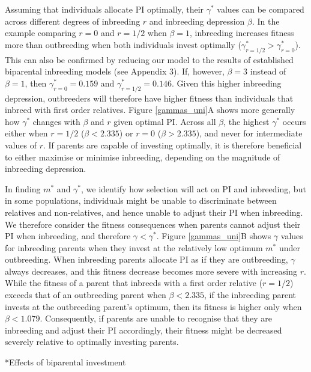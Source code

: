 \documentclass[12pt]{article}
\makeatletter
\renewcommand\subsection{\@startsection{subsection}{1}{-0.25in}{-0.5\baselineskip}{0.1\baselineskip}{\normalfont\normalsize\bfseries\textit}}
\makeatother
\begin{document}
Assuming that individuals allocate PI optimally, their $\gamma^{*}$ values can be compared across different degrees of inbreeding $r$ and inbreeding depression $\beta$. In the example comparing $r=0$ and $r=1/2$ when $\beta=1$, inbreeding increases fitness more than outbreeding when both individuals invest optimally ($\gamma^{*}_{r=1/2}>\gamma^{*}_{r=0}$). This can also be confirmed by reducing our model to the results of established biparental inbreeding models (see Appendix 3). If, however, $\beta=3$ instead of $\beta=1$, then $\gamma^{*}_{r=0}=0.159$ and $\gamma^{*}_{r=1/2}=0.146$. Given this higher inbreeding depression, outbreeders will therefore have higher fitness than individuals that inbreed with first order relatives. Figure \ref{gammas_uni}A shows more generally how $\gamma^{*}$ changes with $\beta$ and $r$ given optimal PI. Across all $\beta$, the highest $\gamma^{*}$ occurs either when $r=1/2$ ($\beta < 2.335$) or $r=0$ ($\beta > 2.335$), and never for intermediate values of $r$. If parents are capable of investing optimally, it is therefore beneficial to either maximise or minimise inbreeding, depending on the magnitude of inbreeding depression.

In finding $m^{*}$ and $\gamma^{*}$, we identify how selection will act on PI and inbreeding, but in some populations, individuals might be unable to discriminate between relatives and non-relatives, and hence unable to adjust their PI when inbreeding. We therefore consider the fitness consequences when parents cannot adjust their PI when inbreeding, and therefore $\gamma < \gamma^{*}$. Figure \ref{gammas_uni}B shows $\gamma$ values for inbreeding parents when they invest at the relatively low optimum $m^{*}$ under outbreeding. When inbreeding parents allocate PI as if they are outbreeding, $\gamma$ always decreases, and this fitness decrease becomes more severe with increasing $r$. While the fitness of a parent that inbreeds with a first order relative ($r=1/2$) exceeds that of an outbreeding parent when $\beta < 2.335$, if the inbreeding parent invests at the outbreeding parent's optimum, then its fitness is higher only when $\beta < 1.079$. Consequently, if parents are unable to recognise that they are inbreeding and adjust their PI accordingly, their fitness might be decreased severely relative to optimally investing parents.


\subsection*{Effects of biparental investment}
\end{document}
